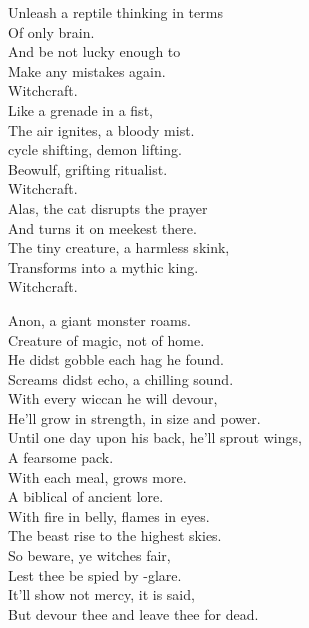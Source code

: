 Unleash a reptile thinking in terms \\
Of only  brain. \\
And be not lucky enough to \\
Make any mistakes again. \\
Witchcraft. \\

Like a grenade in a fist, \\
The air ignites, a bloody mist. \\
 cycle shifting, demon lifting. \\
Beowulf, grifting ritualist. \\
Witchcraft. \\

Alas, the cat disrupts the prayer \\
And turns it on meekest there. \\
The tiny creature, a harmless skink, \\
Transforms into a mythic king. \\
Witchcraft. \\




Anon, a giant monster roams. \\
Creature of magic, not of home. \\
He didst gobble each hag he found. \\
Screams didst echo, a chilling sound. \\
With every wiccan he will devour, \\
He'll grow in strength, in size and power. \\
Until one day upon his back, he'll sprout wings, \\
A fearsome pack. \\

With each meal,  grows more. \\
A biblical  of ancient lore. \\
With fire in belly, flames in eyes. \\
The beast rise to the highest skies. \\
So beware, ye witches fair, \\
Lest thee be spied by -glare. \\
It'll show not mercy, it is said, \\
But devour thee and leave thee for dead. \\


